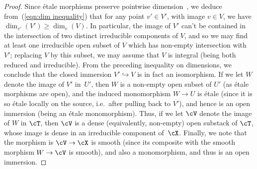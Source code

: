 \begin{proof}
Since \'etale morphisms preserve pointwise
dimension~\cite[\href{http://stacks.math.columbia.edu/tag/04N4}{Tag
  04N4}]{stacks-project},  we deduce from~(\ref{eqn:dim inequality})
that for any point $v' \in V'$,
with image $v \in V$, we have
$\dim_{v'}( V') \geq \dim_v(V)$. 
In particular, the image of $V'$ can't be contained in the intersection
of two distinct irreducible components of $V$, and so we may find 
at least one irreducible open subset of $V$ which has non-empty intersection
with $V'$; replacing $V$ by this subset, we may assume that $V$ is integral
(being both reduced and irreducible).  From the preceding inequality 
on dimensions, we conclude that the closed immersion $V' \hookrightarrow V$
is in fact an isomorphism.
If we let $W$ denote the image of $V'$
in~$U'$, then $W$ is a non-empty
open subset of $U'$ (as \'etale morphisms are open),
and the induced monomorphism $W \to U$ is \'etale
(since it is so \'etale locally on the source, i.e.\ after pulling back
to $V'$), and hence is an open immersion (being an \'etale monomorphism).
Thus, if we let $\cV$ denote the image of $W$ in $\cT$,
then $\cV$ is a dense (equivalently, non-empty) open substack of $\cT$,
whose image is dense in an irreducible component of~$\cX$.
Finally,
we note that the morphism is $\cV \to \cX$ is smooth (since its composite
with the smooth morphism $W\to \cV$ is smooth),
and also a monomorphism, and thus is an open immersion.
\end{proof}

